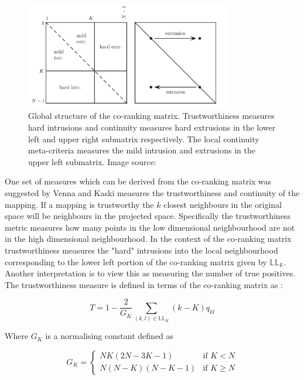 \begin{figure}
	\label{fig:co-ranking-matrix}
	\centering
	\includegraphics[width=0.8\textwidth]{Images/co-ranking.png}	
	\caption{Global structure of the co-ranking matrix. Trustworthiness measures hard intrusions and continuity measures hard extrusions in the lower left and upper right submatrix respectively. The local continuity meta-criteria measures the mild intrusion and extrusions in the upper left submatrix. Image source: \cite{mokbel2013visualizing}}
\end{figure}


One set of measures which can be derived from the co-ranking matrix was suggested by Venna and Kaski \cite{kaski2003trustworthiness} measures the trustworthiness and continuity of the mapping. If a mapping is trustworthy the $k$ closest neighbours in the original space will be neighbours in the projected space. Specifically the trustworthiness metric measures how many points in the low dimensional neighbourhood are not in the high dimensional neighbourhood. In the context of the co-ranking matrix trustworthiness measures the "hard" intrusions into the local neighbourhood corresponding to the lower left portion of the co-ranking matrix given by $\mathbb{LL_K}$. Another interpretation is to view this as measuring the number of true positives. The trustworthiness measure is defined in terms of the co-ranking matrix as \cite{lee2009quality}:

\begin{equation}
	T = 1 - \frac{2}{G_{K}} \sum\limits_{(k,l) \in \mathbb{LL}_K} (k - K)q_{kl}
\end{equation} 

Where $G_K$ is a normalising constant defined as

\begin{equation}
\label{eq:co-ranking-norm}
	G_K =
\left\{
	\begin{array}{ll}
		NK(2N - 3K - 1)  & \mbox{if } K < N \\
		N(N - K)(N - K - 1) & \mbox{if } K \geq N
	\end{array}
\right.
\end{equation}

